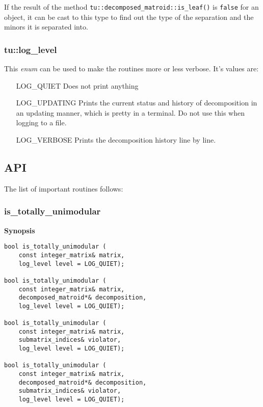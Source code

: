 \documentclass[12pt]{article}
\begin{document}
If the result of the method {\tt tu::decomposed\_matroid::is\_leaf()} is {\tt false} for an object, it can be cast
to this type to find out the type of the separation and the minors it is separated into.

\subsubsection{tu::log\_level}

This {\em enum} can be used to make the routines more or less verbose. It's values are:
\begin{itemize}
\item[LOG\_QUIET]
  Does not print anything
\item[LOG\_UPDATING]
  Prints the current status and history of decomposition in an updating manner, which is pretty in a terminal. Do not use this when logging to a file.
\item[LOG\_VERBOSE]
  Prints the decomposition history line by line.
\end{itemize}

\subsection{API}

The list of important routines follows:

\subsubsection{is\_totally\_unimodular}

{\bf Synopsis} 

{\tiny
{}
\begin{lstlisting}
bool is_totally_unimodular (
    const integer_matrix& matrix,
    log_level level = LOG_QUIET);

bool is_totally_unimodular (
    const integer_matrix& matrix,
    decomposed_matroid*& decomposition,
    log_level level = LOG_QUIET);

bool is_totally_unimodular (
    const integer_matrix& matrix,
    submatrix_indices& violator,
    log_level level = LOG_QUIET);

bool is_totally_unimodular (
    const integer_matrix& matrix,
    decomposed_matroid*& decomposition,
    submatrix_indices& violator,
    log_level level = LOG_QUIET);
\end{lstlisting}}
\end{document}
